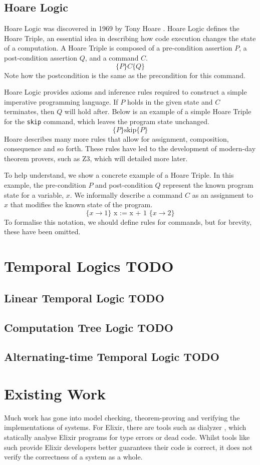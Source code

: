 \subsection{Hoare Logic}
Hoare Logic was discovered in 1969 by Tony Hoare \cite{hoare_logic}. Hoare Logic defines the Hoare Triple, an essential idea in describing how code execution changes the state of a computation. A Hoare Triple is composed of a pre-condition assertion $P$, a post-condition assertion $Q$, and a command $C$.
\[
\{P\} C \{Q\}
\]
Note how the postcondition is the same as the precondition for this command.
\par
Hoare Logic provides axioms and inference rules required to construct a simple imperative programming language. If $P$ holds in the given state and $C$ terminates, then $Q$ will hold after. Below is an example of a simple Hoare Triple for the \texttt{skip} command, which leaves the program state unchanged.
\[
\{P\} \text{skip} \{P\}
\]
Hoare describes many more rules that allow for assignment, composition, consequence and so forth. These rules have led to the development of modern-day theorem provers, such as Z3, which will detailed more later.
\par
To help understand, we show a concrete example of a Hoare Triple. In this example, the pre-condition $P$ and post-condition $Q$ represent the known program state for a variable, $x$. We informally describe a command $C$ as an assignment to $x$ that modifies the known state of the program.
\[
\{ x \rightarrow 1 \} \text{ x := x + 1 } \{ x \rightarrow 2 \}
\]
To formalise this notation, we should define rules for commands, but for brevity, these have been omitted.
\section{Temporal Logics TODO}
\subsection{Linear Temporal Logic TODO}
\subsection{Computation Tree Logic TODO}
\subsection{Alternating-time Temporal Logic TODO}
\section{Existing Work}
Much work has gone into model checking, theorem-proving and verifying the implementations of systems. For Elixir, there are tools such as dialyzer \cite{dialyzer}, which statically analyse Elixir programs for type errors or dead code. Whilst tools like such provide Elixir developers better guarantees their code is correct, it does not verify the correctness of a system as a whole. 
